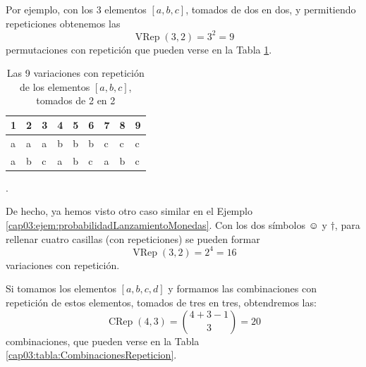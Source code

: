     \begin{center}
    \end{center}
    Por ejemplo, con los 3 elementos $[a,b,c]$, tomados de dos en dos, y permitiendo repeticiones obtenemos las
    \[\operatorname{VRep}(3,2)=3^2=9\]
    permutaciones con repetición que pueden verse en la Tabla \ref{cap03:tabla:variacionesRepeticion}.
        \begin{table}[ht]
        \centering
        \begin{tabular}{lllllllll}
          \hline
          1 & 2 & 3 & 4 & 5 & 6 & 7 & 8 & 9 \\
          \hline
            a & a & a & b & b & b & c & c & c \\
            a & b & c & a & b & c & a & b & c \\
           \hline
        \end{tabular}
        \caption{Las 9 variaciones con repetición de los elementos $[a,b,c]$, tomados de 2 en 2}.\label{cap03:tabla:variacionesRepeticion}
        \end{table}
    De hecho, ya hemos visto otro caso similar en el Ejemplo \ref{cap03:ejem:probabilidadLanzamientoMonedas}. Con los dos símbolos $\smiley$ y $\dagger$, para rellenar cuatro casillas (con repeticiones) se pueden formar
    \[\operatorname{VRep}(3,2)=2^4=16\]
    variaciones con repetición.

    \begin{center}
    \end{center}
    Si tomamos los elementos $[a,b,c,d]$ y formamos las combinaciones con repetición de estos elementos, tomados de tres en tres, obtendremos las:
    \[\operatorname{CRep}(4,3)=\binom{4+3-1}{3}=20\]
    combinaciones, que pueden verse en la Tabla \ref{cap03:tabla:CombinacionesRepeticion}.


